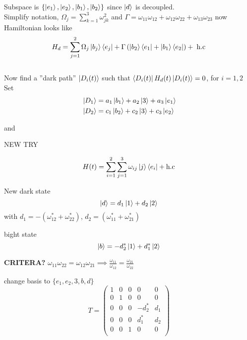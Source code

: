 Subspace is  $\{\ket{e_1}, \ket{e_2}, \ket{b_1}, \ket{b_2} \}$ since $\ket{d}$ is decoupled.\\
Simplify notation, $\Omega_j = \sum_{k = 1}^3 \omega_{jk}^2$ and $\Gamma = \omega_{11}\omega_{12} + \omega_{12}\omega_{22} + \omega_{13}\omega_{23}$ now Hamiltonian looks like 
\begin{equation}
H_d = \sum_{j = 1}^2 \Omega_j \ket{b_j}\bra{e_j} + \Gamma\left(\ket{b_2}\bra{e_1} + \ket{b_1}\bra{e_2} \right) + \; \text{h.c}
\end{equation}
\\
Now find a ''dark path'' $\ket{D_i(t)}$ such that $\bra{D_i(t)}H_d(t)\ket{D_i(t)} = 0$, for $i = 1,2$
\\ Set
\begin{equation}
\begin{aligned} &
 \ket{D_1} = a_1\ket{b_1} + a_2\ket{3} + a_3\ket{e_1}
 \\ &
 \ket{D_2} = c_1\ket{b_2} + c_2\ket{3} + c_3\ket{e_2}
 \end{aligned}
\end{equation}

and


\vspace{3cm}
NEW TRY

\begin{equation}
H(t) = \sum^2_{i = 1} \sum^3_{j = 1} \omega_{ij} \ket{j}\bra{e_i} + \text{h.c}
\end{equation}

New dark state 
\begin{equation}
\ket{d} = d_1\ket{1} + d_2\ket{2}
\end{equation}
with $d_1 = -(\omega_{12}^{*} + \omega_{22}^{*})$, $d_2 = (\omega_{11}^{*} + \omega_{21}^{*})$

bight state 
\begin{equation}
\ket{b} = -d_2^{*}\ket{1} + d_1^{*}\ket{2}
\end{equation}

\textbf{CRITERA?} $\omega_{11}\omega_{22} = \omega_{12}\omega_{21} \implies \frac{\omega_{11}}{\omega_{12}} = \frac{\omega_{21}}{\omega_{22}}$

change basis to $\{e_1, e_2, 3, b, d\}$
\begin{equation}
T = \begin{pmatrix}
1 & 0 & 0 & 0 & 0 \\
0 & 1 & 0 & 0 & 0  \\
0 & 0 & 0 & -d_2^{*} & d_1  \\
0 & 0 & 0 & d_1^{*} & d_2  \\
0 & 0 & 1 & 0 & 0  \\
\end{pmatrix}
\end{equation}


